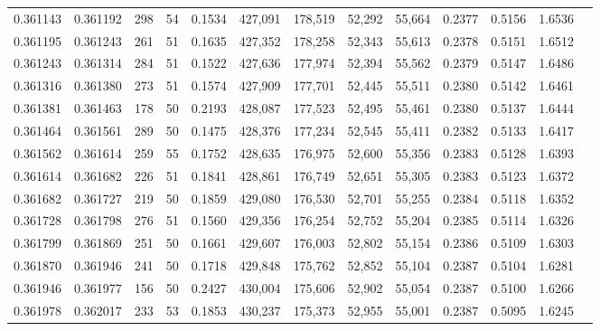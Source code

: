 \begin{tabular}{rrrrrrrrrrrrr}
0.361143 & 0.361192 &   298 &  54 &                                     0.1534 & 427,091 & 178,519 &  52,292 &  55,664 & 0.2377 & 0.5156 & 1.6536 \\
0.361195 & 0.361243 &   261 &  51 &                                     0.1635 & 427,352 & 178,258 &  52,343 &  55,613 & 0.2378 & 0.5151 & 1.6512 \\
0.361243 & 0.361314 &   284 &  51 &                                     0.1522 & 427,636 & 177,974 &  52,394 &  55,562 & 0.2379 & 0.5147 & 1.6486 \\
0.361316 & 0.361380 &   273 &  51 &                                     0.1574 & 427,909 & 177,701 &  52,445 &  55,511 & 0.2380 & 0.5142 & 1.6461 \\
0.361381 & 0.361463 &   178 &  50 &                                     0.2193 & 428,087 & 177,523 &  52,495 &  55,461 & 0.2380 & 0.5137 & 1.6444 \\
0.361464 & 0.361561 &   289 &  50 &                                     0.1475 & 428,376 & 177,234 &  52,545 &  55,411 & 0.2382 & 0.5133 & 1.6417 \\
0.361562 & 0.361614 &   259 &  55 &                                     0.1752 & 428,635 & 176,975 &  52,600 &  55,356 & 0.2383 & 0.5128 & 1.6393 \\
0.361614 & 0.361682 &   226 &  51 &                                     0.1841 & 428,861 & 176,749 &  52,651 &  55,305 & 0.2383 & 0.5123 & 1.6372 \\
0.361682 & 0.361727 &   219 &  50 &                                     0.1859 & 429,080 & 176,530 &  52,701 &  55,255 & 0.2384 & 0.5118 & 1.6352 \\
0.361728 & 0.361798 &   276 &  51 &                                     0.1560 & 429,356 & 176,254 &  52,752 &  55,204 & 0.2385 & 0.5114 & 1.6326 \\
0.361799 & 0.361869 &   251 &  50 &                                     0.1661 & 429,607 & 176,003 &  52,802 &  55,154 & 0.2386 & 0.5109 & 1.6303 \\
0.361870 & 0.361946 &   241 &  50 &                                     0.1718 & 429,848 & 175,762 &  52,852 &  55,104 & 0.2387 & 0.5104 & 1.6281 \\
0.361946 & 0.361977 &   156 &  50 &                                     0.2427 & 430,004 & 175,606 &  52,902 &  55,054 & 0.2387 & 0.5100 & 1.6266 \\
0.361978 & 0.362017 &   233 &  53 &                                     0.1853 & 430,237 & 175,373 &  52,955 &  55,001 & 0.2387 & 0.5095 & 1.6245 \\

\end{tabular}

